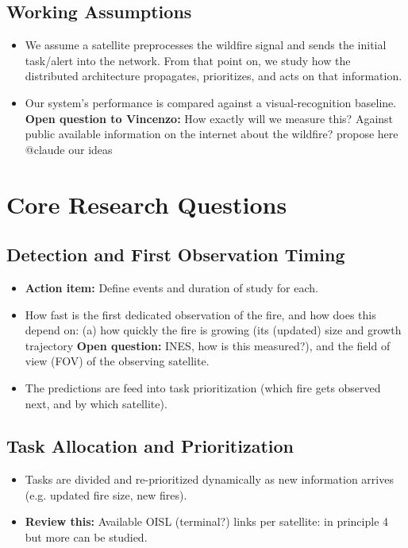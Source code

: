 \documentclass[11pt]{article}
\newcommand{\openquestion}[1]{\textcolor{openq}{\textbf{Open question:}} #1}
\newcommand{\vincenzoq}[1]{\textcolor{vincenzoq}{\textbf{Open question to Vincenzo:}} #1}
\newcommand{\actionitem}[1]{\textcolor{todo}{\textbf{Action item:}} #1}
\newcommand{\review}[1]{\textcolor{review}{\textbf{Review this:}} #1}
\begin{document}
\subsection{Working Assumptions}
\begin{itemize}[leftmargin=1.2cm]
    \item We assume a satellite preprocesses the wildfire signal and sends the initial task/alert into the network. From that point on, we study how the distributed architecture propagates, prioritizes, and acts on that information.
    \item Our system's performance is compared against a visual-recognition baseline. \vincenzoq{How exactly will we measure this? Against public available information on the internet about the wildfire? propose here @claude our ideas}
\end{itemize}

\section{Core Research Questions}

\subsection{Detection and First Observation Timing}
\begin{itemize}[leftmargin=1.2cm]
    \item \actionitem{Define events and duration of study for each.}
    \item How fast is the first dedicated observation of the fire, and how does this depend on: (a) how quickly the fire is growing (its (updated) size and growth trajectory \openquestion{INES, how is this measured?}), and the field of view (FOV) of the observing satellite.
    \item The predictions are feed into task prioritization (which fire gets observed next, and by which satellite).
\end{itemize}

\subsection{Task Allocation and Prioritization}
\begin{itemize}[leftmargin=1.2cm]
    \item Tasks are divided and re-prioritized dynamically as new information arrives (e.g. updated fire size, new fires).
    \item \review{Available OISL (terminal?) links per satellite: in principle 4 but more can be studied.}
\end{itemize}
\end{document}
